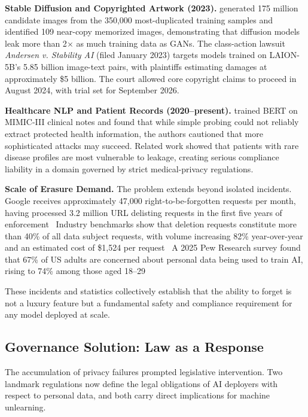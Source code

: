 \textbf{Stable Diffusion and Copyrighted Artwork (2023).} \citeauthor{carlini2023extracting} generated 175 million candidate images from the 350,000 most-duplicated training samples and identified 109 near-copy memorized images, demonstrating that diffusion models leak more than 2$\times$ as much training data as GANs. The class-action lawsuit \textit{Andersen v. Stability AI} (filed January 2023) targets models trained on LAION-5B's 5.85 billion image-text pairs, with plaintiffs estimating damages at approximately \$5 billion. The court allowed core copyright claims to proceed in August 2024, with trial set for September 2026.

\textbf{Healthcare NLP and Patient Records (2020--present).} \citeauthor{lehman2021does} trained BERT on MIMIC-III clinical notes and found that while simple probing could not reliably extract protected health information, the authors cautioned that more sophisticated attacks may succeed. Related work showed that patients with rare disease profiles are most vulnerable to leakage, creating serious compliance liability in a domain governed by strict medical-privacy regulations.

\textbf{Scale of Erasure Demand.} The problem extends beyond isolated incidents. Google receives approximately 47,000 right-to-be-forgotten requests per month, having processed 3.2 million URL delisting requests in the first five years of enforcement~\citeauthor{bertram2019five} Industry benchmarks show that deletion requests constitute more than 40\% of all data subject requests, with volume increasing 82\% year-over-year and an estimated cost of \$1,524 per request~\citeauthor{datagrail2024} A 2025 Pew Research survey found that 67\% of US adults are concerned about personal data being used to train AI, rising to 74\% among those aged 18--29~\citeauthor{kennedy_et_al_2025}

These incidents and statistics collectively establish that the ability to forget is not a luxury feature but a fundamental safety and compliance requirement for any model deployed at scale.


\subsection{Governance Solution: Law as a Response}\label{subsec:gdpr_ccpa}
The accumulation of privacy failures prompted legislative intervention. Two landmark regulations now define the legal obligations of AI deployers with respect to personal data, and both carry direct implications for machine unlearning.

